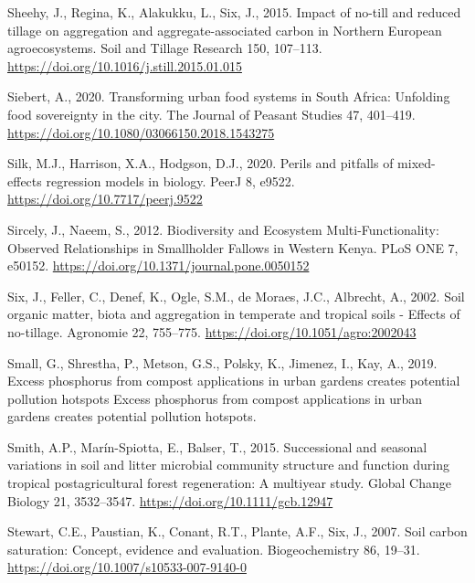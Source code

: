 \documentclass[
  12pt,
]{article}
\newlength{\cslhangindent}
\newlength{\cslentryspacingunit} %
\newenvironment{CSLReferences}[2] %
 {%
  \setlength{\parindent}{0pt}
  \ifodd #1
  \let\oldpar\par
  \def\par{\hangindent=\cslhangindent\oldpar}
  \fi
  \setlength{\parskip}{#2\cslentryspacingunit}
 }%
 {}
\begin{document}
\begin{CSLReferences}{1}{0}
\leavevmode{}%
Sheehy, J., Regina, K., Alakukku, L., Six, J., 2015. Impact of no-till and reduced tillage on aggregation and aggregate-associated carbon in {Northern European} agroecosystems. Soil and Tillage Research 150, 107--113. \url{https://doi.org/10.1016/j.still.2015.01.015}

\leavevmode{}%
Siebert, A., 2020. Transforming urban food systems in {South Africa}: Unfolding food sovereignty in the city. The Journal of Peasant Studies 47, 401--419. \url{https://doi.org/10.1080/03066150.2018.1543275}

\leavevmode{}%
Silk, M.J., Harrison, X.A., Hodgson, D.J., 2020. Perils and pitfalls of mixed-effects regression models in biology. PeerJ 8, e9522. \url{https://doi.org/10.7717/peerj.9522}

\leavevmode{}%
Sircely, J., Naeem, S., 2012. Biodiversity and {Ecosystem Multi-Functionality}: {Observed Relationships} in {Smallholder Fallows} in {Western Kenya}. PLoS ONE 7, e50152. \url{https://doi.org/10.1371/journal.pone.0050152}

\leavevmode{}%
Six, J., Feller, C., Denef, K., Ogle, S.M., de Moraes, J.C., Albrecht, A., 2002. Soil organic matter, biota and aggregation in temperate and tropical soils - {Effects} of no-tillage. Agronomie 22, 755--775. \url{https://doi.org/10.1051/agro:2002043}

\leavevmode{}%
Small, G., Shrestha, P., Metson, G.S., Polsky, K., Jimenez, I., Kay, A., 2019. Excess phosphorus from compost applications in urban gardens creates potential pollution hotspots {Excess} phosphorus from compost applications in urban gardens creates potential pollution hotspots.

\leavevmode{}%
Smith, A.P., Marín-Spiotta, E., Balser, T., 2015. Successional and seasonal variations in soil and litter microbial community structure and function during tropical postagricultural forest regeneration: {A} multiyear study. Global Change Biology 21, 3532--3547. \url{https://doi.org/10.1111/gcb.12947}

\leavevmode{}%
Stewart, C.E., Paustian, K., Conant, R.T., Plante, A.F., Six, J., 2007. Soil carbon saturation: Concept, evidence and evaluation. Biogeochemistry 86, 19--31. \url{https://doi.org/10.1007/s10533-007-9140-0}


\end{CSLReferences}
\end{document}

